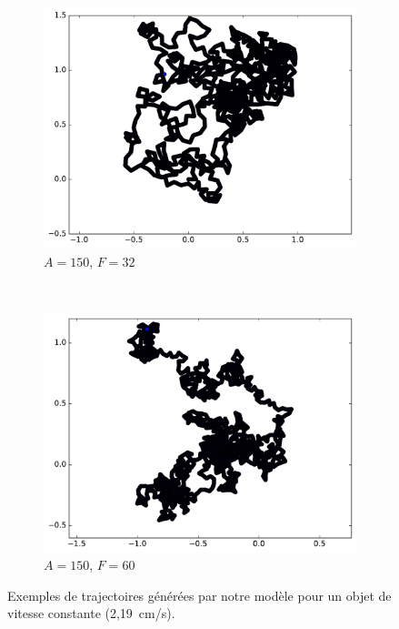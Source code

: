 \begin{appendices}
\begin{figure}[htbp]
\begin{subfigure}[t]{\subImgWmo}
			\includegraphics[width=\textwidth]{figures/ch3/synTraj_219_150_32}
			\caption[$A = 150$, $F=32$]{$A = 150$, $F=32$}
			\label{fig:synTraj_219_150_32}
		\end{subfigure}
		~
		\begin{subfigure}[t]{\subImgWmo}
			\centering
			\includegraphics[width=\textwidth]{figures/ch3/synTraj_219_150_60}
			\caption[$A = 150$, $F=60$]{$A = 150$, $F=60$}
			\label{fig:synTraj_219_150_60}
		\end{subfigure}
		\caption[Mouvements générés par notre modèle -- V]{Exemples de trajectoires générées par notre modèle pour un objet de vitesse constante (2,19~cm/s).}
		\label{fig:motion135150}
	\end{figure}	
	

\end{appendices}
